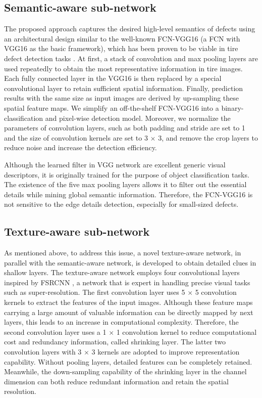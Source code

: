 \documentclass{article}
\begin{document}
\subsection{Semantic-aware sub-network}
\label{Semantic-aware sub-network}
The proposed approach captures the desired high-level semantics of defects using an architectural design similar to the well-known FCN-VGG16 (a FCN with VGG16 as the basic framework), which has been proven to be viable in tire defect detection tasks \cite{wang2019tire}. At first, a stack of convolution and max pooling layers are used repeatedly to obtain the most representative information in tire images. Each fully connected layer in the VGG16 is then replaced by a special convolutional layer to retain sufficient spatial information. Finally, prediction results with the same size as input images are derived by up-sampling these spatial feature maps. We simplify an off-the-shelf FCN-VGG16 into a binary-classification and pixel-wise detection model. Moreover, we normalize the parameters of convolution layers, such as both padding and stride are set to 1 and the size of convolution kernels are set to 3 $\times$ 3, and remove the crop layers to reduce noise and increase the detection efficiency.

Although the learned filter in VGG network are excellent generic visual descriptors, it is originally trained for the purpose of object classification tasks. The existence of the five max pooling layers allows it to filter out the essential details while mining global semantic information. Therefore, the FCN-VGG16 is not sensitive to the edge details detection, especially for small-sized defects.

\subsection{Texture-aware sub-network}
\label{Texture-aware sub-network}
As mentioned above, to address this issue, a novel texture-aware network, in parallel with the semantic-aware network, is developed to obtain detailed clues in shallow layers. The texture-aware network employs four convolutional layers inspired by FSRCNN \cite{dong2016accelerating}, a network that is expert in handling precise visual tasks such as super-resolution. The first convolution layer uses 5 $\times$ 5 convolution kernels to extract the features of the input images. Although these feature maps carrying a large amount of valuable information can be directly mapped by next layers, this leads to an increase in computational complexity. Therefore, the second convolution layer uses a 1 $\times$ 1 convolution kernel to reduce computational cost and redundancy information, called shrinking layer. The latter two convolution layers with 3 $\times$ 3 kernels are adopted to improve representation capability. Without pooling layers, detailed features can be completely retained. Meanwhile, the down-sampling capability of the shrinking layer in the channel dimension can both reduce redundant information and retain the spatial resolution.
\end{document}
